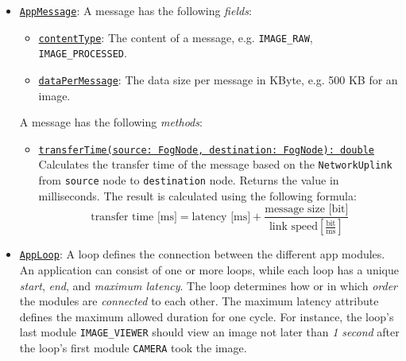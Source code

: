 \begin{itemize}
    \item \underline{\texttt{AppMessage}}: A message has the following \textit{fields}:
    \begin{itemize}
        \item \underline{\texttt{contentType}}: The content of a message, e.g. \texttt{IMAGE\_RAW}, \texttt{IMAGE\_PROCESSED}.
        \item \underline{\texttt{dataPerMessage}}: The data size per message in KByte, e.g. 500 KB for an image.
    \end{itemize}
    A message has the following \textit{methods}:
    \begin{itemize}
        \item \underline{\texttt{transferTime(source: FogNode, destination: FogNode): double}}\\
        Calculates the transfer time of the message based on the \texttt{NetworkUplink} from \texttt{source} node to \texttt{destination} node. Returns the value in milliseconds. The result is calculated using the following formula:
        \[\textrm{transfer time [ms]} = \textrm{latency [ms]} + \frac{\textrm{message size [bit]}}{\textrm{link speed} [\frac{\textrm{bit}}{\textrm{ms}}]}\]
    \end{itemize}
   
   \item \underline{\texttt{AppLoop}}: A loop defines the connection between the different app modules.
   An application can consist of one or more loops, while each loop has a unique \textit{start}, \textit{end}, and \textit{maximum latency}.
   The loop determines how or in which \textit{order} the modules are \textit{connected} to each other.
   The maximum latency attribute defines the maximum allowed duration for one cycle.
   For instance, the loop's last module \texttt{IMAGE\_VIEWER} should view an image not later than \textit{1 second} after the loop's first module \texttt{CAMERA} took the image.
   

\end{itemize}
